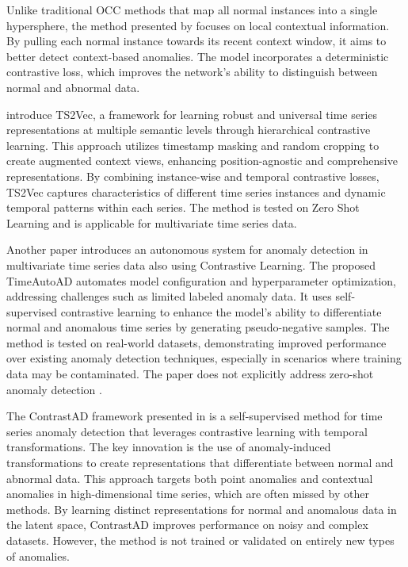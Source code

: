 Unlike traditional OCC methods that map all normal instances into a single hypersphere, the method presented by \cite{chen_time-series_2023} focuses on local contextual information. By pulling each normal instance towards its recent context window, it aims to better detect context-based anomalies. The model incorporates a deterministic contrastive loss, which improves the network's ability to distinguish between normal and abnormal data.

\cite{yue_ts2vec_2022} introduce TS2Vec, a framework for learning robust and universal time series representations at multiple semantic levels through hierarchical contrastive learning. This approach utilizes timestamp masking and random cropping to create augmented context views, enhancing position-agnostic and comprehensive representations. By combining instance-wise and temporal contrastive losses, TS2Vec captures characteristics of different time series instances and dynamic temporal patterns within each series. The method is tested on Zero Shot Learning and is applicable for multivariate time series data.

Another paper introduces an autonomous system for anomaly detection in multivariate time series data also using Contrastive Learning. The proposed TimeAutoAD automates model configuration and hyperparameter optimization, addressing challenges such as limited labeled anomaly data. It uses self-supervised contrastive learning to enhance the model's ability to differentiate normal and anomalous time series by generating pseudo-negative samples. The method is tested on real-world datasets, demonstrating improved performance over existing anomaly detection techniques, especially in scenarios where training data may be contaminated. The paper does not explicitly address zero-shot anomaly detection \cite{jiao_timeautoad_2022}.

The ContrastAD framework presented in \cite{li_contrastive_2023} is a self-supervised method for time series anomaly detection that leverages contrastive learning with temporal transformations. The key innovation is the use of anomaly-induced transformations to create representations that differentiate between normal and abnormal data. This approach targets both point anomalies and contextual anomalies in high-dimensional time series, which are often missed by other methods. By learning distinct representations for normal and anomalous data in the latent space, ContrastAD improves performance on noisy and complex datasets. However, the method is not trained or validated on entirely new types of anomalies.

